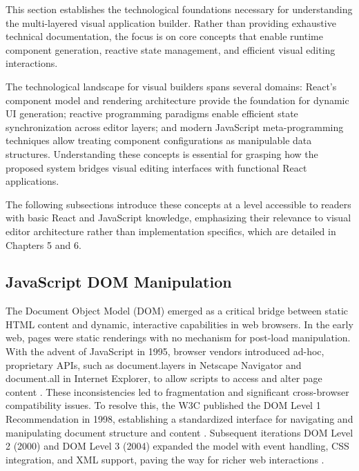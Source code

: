 \documentclass[oneside,12pt]{book}
\begin{document}
This section establishes the technological foundations necessary for understanding the multi-layered visual application builder. Rather than providing exhaustive technical documentation, the focus is on core concepts that enable runtime component generation, reactive state management, and efficient visual editing interactions.

The technological landscape for visual builders spans several domains: React's component model and rendering architecture provide the foundation for dynamic UI generation; reactive programming paradigms enable efficient state synchronization across editor layers; and modern JavaScript meta-programming techniques allow treating component configurations as manipulable data structures. Understanding these concepts is essential for grasping how the proposed system bridges visual editing interfaces with functional React applications.

The following subsections introduce these concepts at a level accessible to readers with basic React and JavaScript knowledge, emphasizing their relevance to visual editor architecture rather than implementation specifics, which are detailed in Chapters 5 and 6.

\subsection{JavaScript DOM Manipulation}

The Document Object Model (DOM) emerged as a critical bridge between static HTML content and dynamic, interactive capabilities in web browsers. In the early web, pages were static renderings with no mechanism for post-load manipulation. With the advent of JavaScript in 1995, browser vendors introduced ad-hoc, proprietary APIs, such as document.layers in Netscape Navigator and document.all in Internet Explorer, to allow scripts to access and alter page content \cite{holzner2002insidejavascript}. These inconsistencies led to fragmentation and significant cross-browser compatibility issues. To resolve this, the W3C published the DOM Level 1 Recommendation in 1998, establishing a standardized interface for navigating and manipulating document structure and content \cite{w3c1998dom}. Subsequent iterations DOM Level 2 (2000) and DOM Level 3 (2004) expanded the model with event handling, CSS integration, and XML support, paving the way for richer web interactions \cite{w3c2000dom2, w3c2004dom3}.
\end{document}

